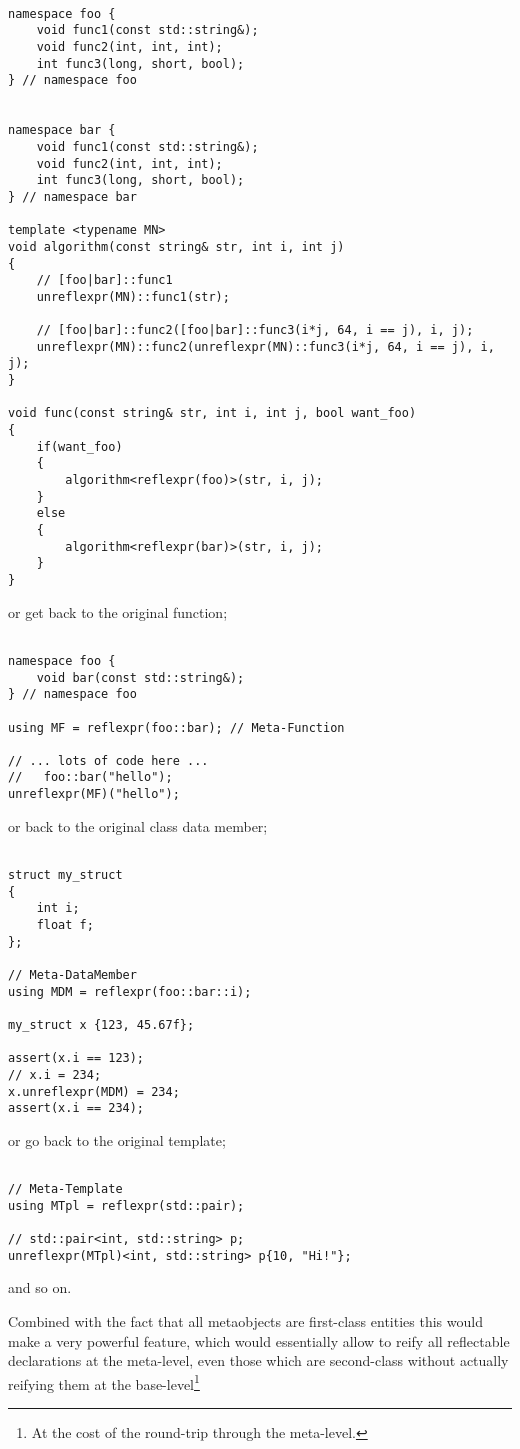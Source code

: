 \begin{verbatim}

namespace foo {
	void func1(const std::string&);
	void func2(int, int, int);
	int func3(long, short, bool);
} // namespace foo


namespace bar {
	void func1(const std::string&);
	void func2(int, int, int);
	int func3(long, short, bool);
} // namespace bar

template <typename MN>
void algorithm(const string& str, int i, int j)
{
	// [foo|bar]::func1
	unreflexpr(MN)::func1(str);

	// [foo|bar]::func2([foo|bar]::func3(i*j, 64, i == j), i, j);
	unreflexpr(MN)::func2(unreflexpr(MN)::func3(i*j, 64, i == j), i, j);
}

void func(const string& str, int i, int j, bool want_foo)
{
	if(want_foo)
	{
		algorithm<reflexpr(foo)>(str, i, j);
	}
	else 
	{
		algorithm<reflexpr(bar)>(str, i, j);
	}
}

\end{verbatim}

or get back to the original function;

\begin{verbatim}

namespace foo {
	void bar(const std::string&);
} // namespace foo

using MF = reflexpr(foo::bar); // Meta-Function

// ... lots of code here ...
//   foo::bar("hello");
unreflexpr(MF)("hello");

\end{verbatim}

or back to the original class data member;

\begin{verbatim}

struct my_struct
{
	int i;
	float f;
};

// Meta-DataMember
using MDM = reflexpr(foo::bar::i);

my_struct x {123, 45.67f};

assert(x.i == 123);
// x.i = 234;
x.unreflexpr(MDM) = 234;
assert(x.i == 234);

\end{verbatim}

or go back to the original template;

\begin{verbatim}

// Meta-Template
using MTpl = reflexpr(std::pair);

// std::pair<int, std::string> p;
unreflexpr(MTpl)<int, std::string> p{10, "Hi!"};

\end{verbatim}

and so on.

Combined with the fact that all metaobjects are first-class
entities this would make a very powerful feature, which would essentially
allow to reify all reflectable declarations at the meta-level, even those which are
second-class without actually reifying them at the base-level\footnote
{At the cost of the round-trip through the meta-level.}


